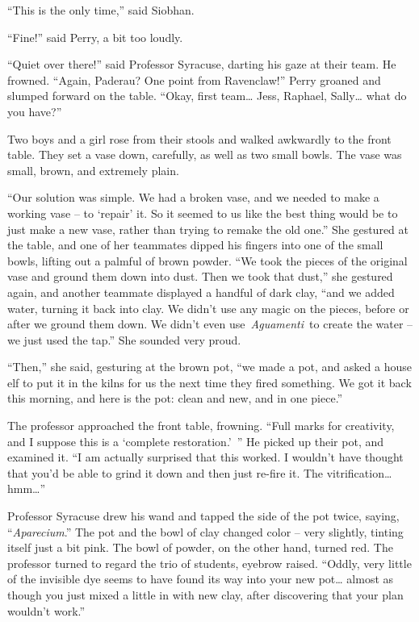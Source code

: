 ``This is the only time,'' said Siobhan.

``Fine!'' said Perry, a bit too loudly.

``Quiet over there!'' said Professor Syracuse, darting his gaze at their
team. He frowned. ``Again, Paderau? One point from Ravenclaw!'' Perry
groaned and slumped forward on the table. ``Okay, first team\ldots{}
Jess, Raphael, Sally\ldots{} what do you have?''

Two boys and a girl rose from their stools and walked awkwardly to the
front table. They set a vase down, carefully, as well as two small
bowls. The vase was small, brown, and extremely plain.

``Our solution was simple. We had a broken vase, and we needed to make a
working vase -- to `repair' it. So it seemed to us like the best thing
would be to just make a new vase, rather than trying to remake the old
one.'' She gestured at the table, and one of her teammates dipped his
fingers into one of the small bowls, lifting out a palmful of brown
powder. ``We took the pieces of the original vase and ground them down
into dust. Then we took that dust,'' she gestured again, and another
teammate displayed a handful of dark clay, ``and we added water, turning
it back into clay. We didn't use any magic on the pieces, before or
after we ground them down. We didn't even use~\emph{Aguamenti}~to create
the water -- we just used the tap.'' She sounded very proud.

``Then,'' she said, gesturing at the brown pot, ``we made a pot, and
asked a house elf to put it in the kilns for us the next time they fired
something. We got it back this morning, and here is the pot: clean and
new, and in one piece.''

The professor approached the front table, frowning. ``Full marks for
creativity, and I suppose this is a `complete restoration.'~'' He picked
up their pot, and examined it. ``I am actually surprised that this
worked. I wouldn't have thought that you'd be able to grind it down and
then just re-fire it. The vitrification\ldots{} hmm\ldots{}''

Professor Syracuse drew his wand and tapped the side of the pot twice,
saying, ``\emph{Aparecium}.'' The pot and the bowl of clay changed color
-- very slightly, tinting itself just a bit pink. The bowl of powder, on
the other hand, turned red. The professor turned to regard the trio of
students, eyebrow raised. ``Oddly, very little of the invisible dye
seems to have found its way into your new pot\ldots{} almost as though
you just mixed a little in with new clay, after discovering that your
plan wouldn't work.''

